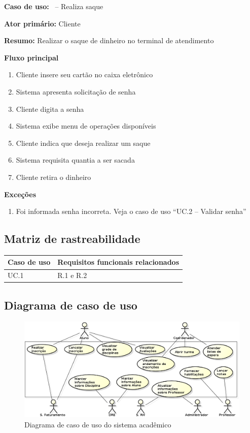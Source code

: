 \documentclass[11pt]{report}
\begin{document}
\noindent\textbf{Caso de uso:} \casodeuso~-- Realiza saque

\noindent\textbf{Ator primário:} Cliente

\noindent\textbf{Resumo: } Realizar o saque de dinheiro no terminal de atendimento

\noindent\textbf{Fluxo principal} 
\begin{enumerate}
	\item Cliente insere seu cartão no caixa eletrônico
	\item Sistema apresenta solicitação de senha
	\item Cliente digita a senha
	\item Sistema exibe menu de operações disponíveis
	\item Cliente indica que deseja realizar um saque
	\item Sistema requisita quantia a ser sacada
	\item Cliente retira o dinheiro
\end{enumerate}

\noindent\textbf{Exceções}
\begin{enumerate}
	\item Foi informada senha incorreta. Veja o caso de uso ``UC.2 -- Validar senha''
\end{enumerate}


\subsection{Matriz de rastreabilidade}

\noindent\begin{tabular}{|l|l|}\hline
\textbf{Caso de uso} & \textbf{Requisitos funcionais relacionados}\\\hline
UC.1 & R.1 e R.2\\\hline
\end{tabular}

\clearpage
\subsection{Diagrama de caso de uso}

\begin{figure}[!htbp]
	\centering
	\includegraphics[width=\linewidth]{figuras/sist-acad}
	\caption{Diagrama de caso de uso do sistema acadêmico}
	\label{fig:usecase}
\end{figure}






\end{document}
